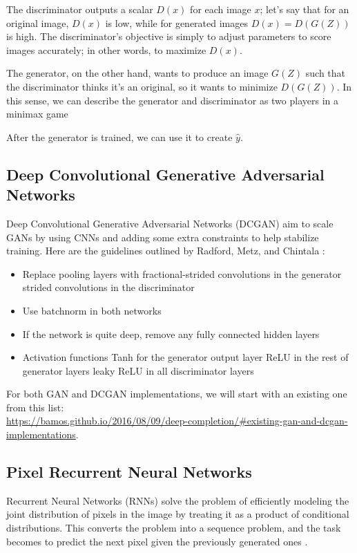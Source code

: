 \documentclass[10pt,twocolumn,letterpaper]{article}
\begin{document}
\par The discriminator outputs a scalar $D(x)$ for each image $x$; let's say that for an original image, $D(x)$ is low, while for generated images $D(x) = D(G(Z))$ is high. The discriminator's objective is simply to adjust parameters to score images accurately; in other words, to maximize $D(x)$.

The generator, on the other hand, wants to produce an image $G(Z)$ such that the discriminator thinks it's an original, so it wants to minimize $D(G(Z))$. In this sense, we can describe the generator and discriminator as two players in a minimax game \cite{GAN}

After the generator is trained, we can use it to create $\hat{y}$. 


\subsection{Deep Convolutional Generative Adversarial Networks}
Deep Convolutional Generative Adversarial Networks (DCGAN) aim to scale GANs by using CNNs and adding some extra constraints to help stabilize training. Here are the guidelines outlined by Radford, Metz, and Chintala \cite{DCGAN}:
\begin{itemize}
\item Replace pooling layers with
\subitem fractional-strided convolutions in the generator
\subitem strided convolutions in the discriminator
\item Use batchnorm in both networks
\item If the network is quite deep, remove any fully connected hidden layers
\item Activation functions
\subitem Tanh for the generator output layer
\subitem ReLU in the rest of generator layers 
\subitem leaky ReLU in all discriminator layers
\end{itemize}

For both GAN and DCGAN implementations, we will start with an existing one from this list: \\
 \url{https://bamos.github.io/2016/08/09/deep-completion/#existing-gan-and-dcgan-implementations}.

\subsection{Pixel Recurrent Neural Networks}
Recurrent Neural Networks (RNNs) solve the problem of efficiently modeling the joint distribution of pixels in the image by treating it as a product of conditional distributions. This converts the problem into a sequence problem, and the task becomes to predict the next pixel given the previously generated ones \cite{pixelRNN}. 
\end{document}
